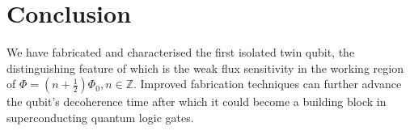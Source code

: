 \section{Conclusion}
 
 \vspace{-1em}
 
 \noindent We have fabricated and characterised the first isolated twin qubit, the distinguishing feature of which is the weak flux sensitivity in the working region of $ \Phi = (n+\frac{1}{2})\Phi_0, n\in\mathbb{Z} $. Improved fabrication techniques can further advance the qubit's decoherence time after which it could become a building block in superconducting quantum logic gates.


